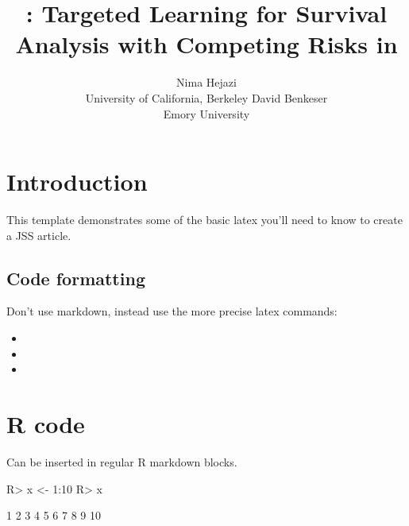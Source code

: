 \documentclass[article]{jss}
\author{
Nima Hejazi\\University of California, Berkeley \And David Benkeser\\Emory University
}
\title{\pkg{survtmle}: Targeted Learning for Survival Analysis with Competing
Risks in \proglang{R}}
\providecommand{\tightlist}{%
  \setlength{\itemsep}{0pt}\setlength{\parskip}{0pt}}
\begin{document}
\section{Introduction}\label{introduction}

This template demonstrates some of the basic latex you'll need to know
to create a JSS article.

\subsection{Code formatting}\label{code-formatting}

Don't use markdown, instead use the more precise latex commands:

\begin{itemize}
\tightlist
\item
\item
\item
\end{itemize}

\section{R code}\label{r-code}

Can be inserted in regular R markdown blocks.

\begin{CodeChunk}

\begin{CodeInput}
R> x <- 1:10
R> x
\end{CodeInput}

\begin{CodeOutput}
 [1]  1  2  3  4  5  6  7  8  9 10
\end{CodeOutput}
\end{CodeChunk}

\renewcommand\refname{References}

\end{document}
